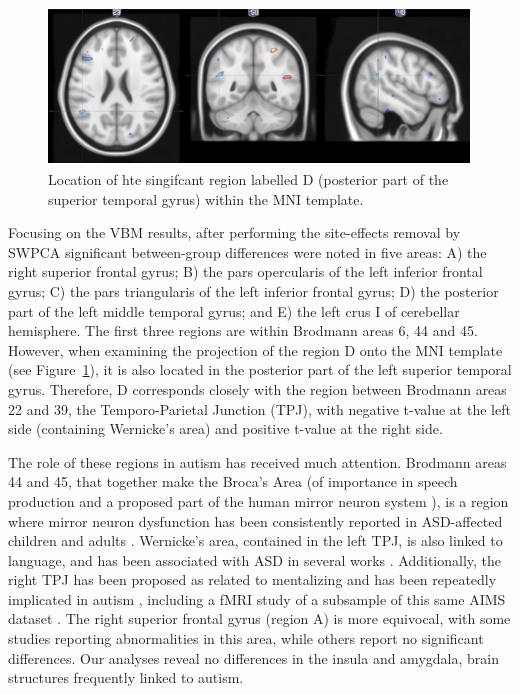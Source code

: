 \begin{figure}
\centering
\includegraphics[width=0.7\linewidth]{Graphics/ch7/FIGURE06}
\caption[Location of hte singifcant region labelled D (posterior part of the superior temporal gyrus) within the \acs{MNI} template.]{Location of hte singifcant region labelled D (posterior part of the superior temporal gyrus) within the \acs{MNI} template.}
\label{fig:figure06}
\end{figure}

Focusing on the \ac{VBM} results, after performing the site-effects removal by \ac{SWPCA} significant between-group differences were noted in five areas: A) the right superior frontal gyrus; B) the pars opercularis of the left inferior frontal gyrus; C) the pars triangularis of the left inferior frontal gyrus; D) the posterior part of the left middle temporal gyrus; and E) the left crus I of cerebellar hemisphere. The first three regions are within Brodmann areas 6, 44 and 45. However, when examining the projection of the region D onto the \ac{MNI} template (see Figure~\ref{fig:figure06}), it is also located in the posterior part of the left superior temporal gyrus. Therefore, D corresponds closely with the region between Brodmann areas 22 and 39, the Temporo-Parietal Junction (TPJ), with negative t-value at the left side (containing Wernicke's area) and positive t-value at the right side. 

The role of these regions in autism has received much attention. Brodmann areas 44 and 45, that together make the Broca's Area (of importance in speech production and a proposed part of the human mirror neuron system \cite{Nishitani2005}), is a region where mirror neuron dysfunction has been consistently reported in \ac{ASD}-affected children \cite{Dapretto2006} and adults \cite{Hadjikhani2006,Lopez-Hurtado2008,Verly2014}. Wernicke's area, contained in the left TPJ, is also linked to language, and has been associated with \ac{ASD} in several works \cite{Hadjikhani2006,Verly2014}. Additionally, the right TPJ has been proposed as related to mentalizing and has been repeatedly implicated in autism \cite{Barnea-Goraly2004}, including a f\ac{MRI} study of a subsample of this same AIMS dataset \cite{Lombardo2011}. The right superior frontal gyrus (region A) is more equivocal, with some studies \cite{Ecker2010,Ecker2012} reporting abnormalities in this area, while others \cite{Hadjikhani2006,Segovia2014} report no significant differences. Our analyses reveal no differences in the insula and amygdala, brain structures frequently linked to autism. 

